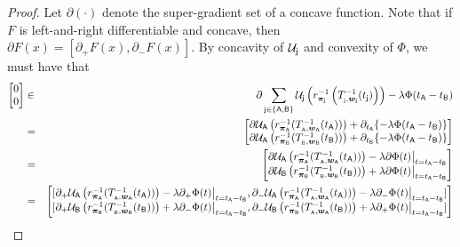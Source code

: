 	\begin{proof}


	Let $\partial (\cdot)$ denote the super-gradient set of a concave function. Note that if $F$ is left-and-right differentiable and concave, then $\partial F(x) = [\partial_+ F(x), \partial_- F(x)]$. 
	By concavity of $\mathcal{U}_{\mathsf{j}}$ and convexity of $\Phi$, we must have that 
	\begin{eqnarray*}
	\begin{bmatrix}
	0 \\ 
	0 
	\end{bmatrix} &\in& \partial \sum_{\popj \in \pops}\Util\supj\left(\ratef_{\distj}^{-1}\left(\constfj^{-1}(t\supj)\right)\right) - \lambda \Phi(t\supa - t\supb) \\
	&=&
	\begin{bmatrix}
	\partial \Util\supa\left(\ratef_{\dista}^{-1}(\constfa^{-1}(t\supa))\right) +  \partial_{t\supa} \{- \lambda \Phi(t\supa - t\supb)\} \\ 
	\partial \Util\supa\left(\ratef_{\distb}^{-1}(\constfb^{-1}(t\supb))\right) + \partial_{t\supb} \{- \lambda \Phi(t\supa - t\supb)\} \\
	\end{bmatrix}\\
	&=& \begin{bmatrix}
	\partial \Util\supa\left(\ratef_{\dista}^{-1}(\constfa^{-1}(t\supa))\right) - \lambda  \partial  \Phi(t)\big{|}_{t = t\supa - t\supb} \\
	\partial \Util\supb\left(\ratef_{\distb}^{-1}(\constfb^{-1}(t\supb))\right) + \lambda \partial \Phi(t) \big{|}_{t = t\supa - t\supb} \\
	\end{bmatrix}\\
	&=& \begin{bmatrix}
	[\partial_+ \Util\supa\left(\ratef_{\dista}^{-1}(\constfa^{-1}(t\supa))\right) - \lambda  \partial_+  \Phi(t)\big{|}_{t = t\supa - t\supb} , \partial_- \Util\supa\left(\ratef_{\dista}^{-1}(\constfa^{-1}(t\supa))\right) - \lambda  \partial_-  \Phi(t)\big{|}_{t = t\supa - t\supb}] \\
	[\partial_+ \Util\supb\left(\ratef_{\distb}^{-1}(\constfb^{-1}(t\supb))\right) + \lambda \partial_- \Phi(t) \big{|}_{t = t\supa - t\supb}, \partial_- \Util\supb\left(\ratef_{\distb}^{-1}(\constfa^{-1}(t\supb))\right) + \lambda \partial_+ \Phi(t) \big{|}_{t = t\supa - t\supb}] \\
	\end{bmatrix}\\

\end{eqnarray*}
\end{proof}
